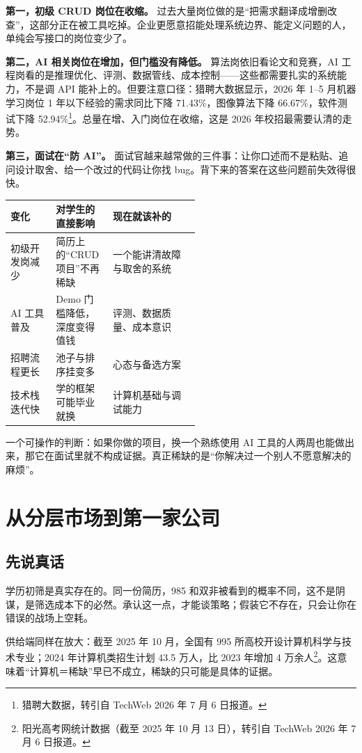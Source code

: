 \documentclass[UTF8,zihao=5,openany]{ctexbook}
\begin{document}
\textbf{第一，初级 CRUD 岗位在收缩。} 过去大量岗位做的是“把需求翻译成增删改查”，这部分正在被工具吃掉。企业更愿意招能处理系统边界、能定义问题的人，单纯会写接口的岗位变少了。

\textbf{第二，AI 相关岗位在增加，但门槛没有降低。} 算法岗依旧看论文和竞赛，AI 工程岗看的是推理优化、评测、数据管线、成本控制——这些都需要扎实的系统能力，不是调 API 能补上的。但要注意口径：猎聘大数据显示，2026 年 1--5 月机器学习岗位 1 年以下经验的需求同比下降 71.43\%，图像算法下降 66.67\%，软件测试下降 52.94\%\footnote{猎聘大数据，转引自 TechWeb 2026 年 7 月 6 日报道。}。总量在增、入门岗位在收缩，这是 2026 年校招最需要认清的走势。

\textbf{第三，面试在“防 AI”。} 面试官越来越常做的三件事：让你口述而不是粘贴、追问设计取舍、给一个改过的代码让你找 bug。背下来的答案在这些问题前失效得很快。

\begin{center}\small
\begin{tabularx}{\linewidth}{p{0.24\linewidth}p{0.30\linewidth}Y}
\toprule
变化 & 对学生的直接影响 & 现在就该补的 \\
\midrule
初级开发岗减少 & 简历上的“CRUD 项目”不再稀缺 & 一个能讲清故障与取舍的系统 \\
AI 工具普及 & Demo 门槛降低，深度变得值钱 & 评测、数据质量、成本意识 \\
招聘流程更长 & 池子与排序挂变多 & 心态与备选方案 \\
技术栈迭代快 & 学的框架可能毕业就换 & 计算机基础与调试能力 \\
\bottomrule
\end{tabularx}
\end{center}

一个可操作的判断：如果你做的项目，换一个熟练使用 AI 工具的人两周也能做出来，那它在面试里就不构成证据。真正稀缺的是“你解决过一个别人不愿意解决的麻烦”。


\clearpage\chapter{从分层市场到第一家公司}
\section{先说真话}
学历初筛是真实存在的。同一份简历，985 和双非被看到的概率不同，这不是阴谋，是筛选成本下的必然。承认这一点，才能谈策略；假装它不存在，只会让你在错误的战场上空耗。

供给端同样在放大：截至 2025 年 10 月，全国有 995 所高校开设计算机科学与技术专业；2024 年计算机类招生计划 43.5 万人，比 2023 年增加 4 万余人\footnote{阳光高考网统计数据（截至 2025 年 10 月 13 日），转引自 TechWeb 2026 年 7 月 6 日报道。}。这意味着“计算机＝稀缺”早已不成立，稀缺的只可能是具体的证据。
\end{document}
